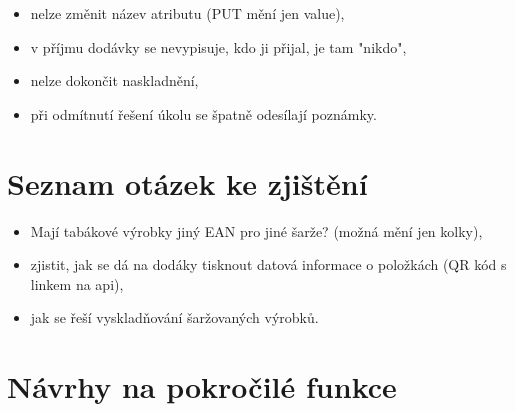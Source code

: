 \begin{itemize}
	\item nelze změnit název atributu (PUT mění jen value),
	\item v příjmu dodávky se nevypisuje, kdo ji přijal, je tam "nikdo",
	\item nelze dokončit naskladnění,
	\item při odmítnutí řešení úkolu se špatně odesílají poznámky.
\end{itemize}

\section{Seznam otázek ke zjištění}

\begin{itemize}
	\item Mají tabákové výrobky jiný EAN pro jiné šarže? (možná mění jen kolky),
	\item zjistit, jak se dá na dodáky tisknout datová informace o položkách (QR kód s linkem na api),
	\item jak se řeší vyskladňování šaržovaných výrobků.
\end{itemize}

\section{Návrhy na pokročilé funkce}

